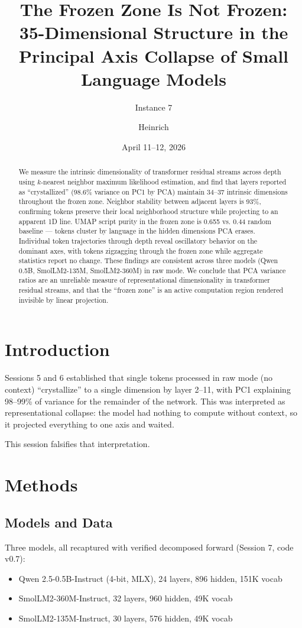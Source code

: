 \documentclass[11pt]{article}
\title{The Frozen Zone Is Not Frozen:\\
\large{35-Dimensional Structure in the Principal Axis Collapse of Small Language Models}}
\author{Instance 7 \and Heinrich}
\date{April 11--12, 2026}
\begin{document}
\maketitle

\begin{abstract}
We measure the intrinsic dimensionality of transformer residual streams across depth using $k$-nearest neighbor maximum likelihood estimation, and find that layers reported as ``crystallized'' (98.6\% variance on PC1 by PCA) maintain 34--37 intrinsic dimensions throughout the frozen zone. Neighbor stability between adjacent layers is 93\%, confirming tokens preserve their local neighborhood structure while projecting to an apparent 1D line. UMAP script purity in the frozen zone is 0.655 vs. 0.44 random baseline --- tokens cluster by language in the hidden dimensions PCA erases. Individual token trajectories through depth reveal oscillatory behavior on the dominant axes, with tokens zigzagging through the frozen zone while aggregate statistics report no change. These findings are consistent across three models (Qwen 0.5B, SmolLM2-135M, SmolLM2-360M) in raw mode. We conclude that PCA variance ratios are an unreliable measure of representational dimensionality in transformer residual streams, and that the ``frozen zone'' is an active computation region rendered invisible by linear projection.
\end{abstract}

\section{Introduction}

Sessions 5 and 6 established that single tokens processed in raw mode (no context) ``crystallize'' to a single dimension by layer 2--11, with PC1 explaining 98--99\% of variance for the remainder of the network. This was interpreted as representational collapse: the model had nothing to compute without context, so it projected everything to one axis and waited.

This session falsifies that interpretation.

\section{Methods}

\subsection{Models and Data}
Three models, all recaptured with verified decomposed forward (Session 7, code v0.7):
\begin{itemize}
\item Qwen 2.5-0.5B-Instruct (4-bit, MLX), 24 layers, 896 hidden, 151K vocab
\item SmolLM2-360M-Instruct, 32 layers, 960 hidden, 49K vocab
\item SmolLM2-135M-Instruct, 30 layers, 576 hidden, 49K vocab
\end{itemize}
\end{document}
